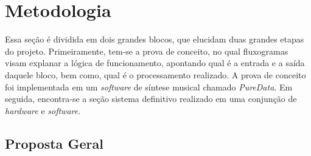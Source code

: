 \chapter[Metodologia]{Metodologia}

Essa seção é dividida em dois grandes blocos, que elucidam duas grandes etapas do projeto. Primeiramente, tem-se a prova de conceito, no qual fluxogramas visam explanar a lógica de funcionamento, apontando qual é a entrada e a saída daquele bloco, bem como, qual é o processamento realizado. A prova de conceito foi implementada em um \textit{software} de síntese musical chamado \textit{PureData}.
Em seguida, encontra-se a seção sistema definitivo realizado em uma conjunção de \textit{hardware} e \textit{software}. %

\section{Proposta Geral}



